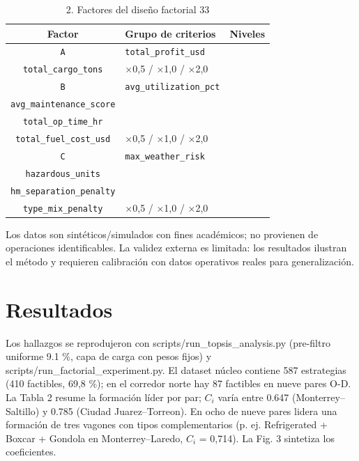 \documentclass[runningheads]{llncs}
\begin{document}
\begin{table}[t]
\centering
\caption{2. Factores del diseño factorial 33}
\begin{tabular}{|c|p{6.4cm}|c|}
\hline
\textbf{Factor} & \textbf{Grupo de criterios} & \textbf{Niveles} \\
\hline
\texttt{A} & \texttt{total\_profit\_usd} \\ \texttt{total\_cargo\_tons} & ×0,5 / ×1,0 / ×2,0 \\
\hline
\texttt{B} & \texttt{avg\_utilization\_pct} \\ \texttt{avg\_maintenance\_score} \\ \texttt{total\_op\_time\_hr} \\ \texttt{total\_fuel\_cost\_usd} & ×0,5 / ×1,0 / ×2,0 \\
\hline
\texttt{C} & \texttt{max\_weather\_risk} \\ \texttt{hazardous\_units} \\ \texttt{hm\_separation\_penalty} \\ \texttt{type\_mix\_penalty} & ×0,5 / ×1,0 / ×2,0 \\
\hline
\end{tabular}
\end{table}
Los datos son sintéticos/simulados con fines académicos; no provienen de operaciones identificables. La validez externa es limitada: los resultados ilustran el método y requieren calibración con datos operativos reales para generalización.

\section{Resultados}
Los hallazgos se reprodujeron con scripts/run\_topsis\_analysis.py (pre-filtro uniforme 9.1 \%, capa de carga con pesos fijos) y scripts/run\_factorial\_experiment.py. El dataset núcleo contiene 587 estrategias (410 factibles, 69,8 \%); en el corredor norte hay 87 factibles en nueve pares O-D. La Tabla 2 resume la formación líder por par; $C_i$ varía entre 0.647 (Monterrey–Saltillo) y 0.785 (Ciudad Juarez–Torreon). En ocho de nueve pares lidera una formación de tres vagones con tipos complementarios (p. ej. Refrigerated + Boxcar + Gondola en Monterrey–Laredo, $C_i$ = 0,714). La Fig. 3 sintetiza los coeficientes.
\end{document}
